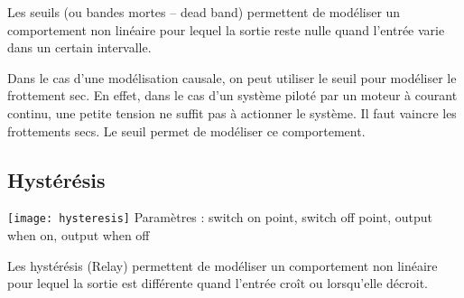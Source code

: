 \begin{marginfigure}[1cm]
\centering
{}
\end{marginfigure}


Les seuils (ou bandes mortes -- dead band) permettent de modéliser un comportement non linéaire pour lequel la sortie reste nulle quand l'entrée varie dans un certain intervalle. 

Dans le cas d'une modélisation causale, on peut utiliser le seuil pour modéliser le frottement sec. En effet, dans le cas d'un système piloté par un moteur à courant continu, une petite tension ne suffit pas à actionner le système. Il faut vaincre les frottements secs. Le seuil permet de modéliser ce comportement.


\subsection{Hystérésis}

\begin{marginfigure}
\centering
\texttt{[image: hysteresis]}
Paramètres : switch on point, switch off point, output when on, output when off
\end{marginfigure}

\begin{marginfigure}
\centering
{}
\end{marginfigure}

Les hystérésis (Relay) permettent de modéliser un comportement non linéaire pour lequel la sortie est différente quand l'entrée croît ou lorsqu'elle décroit. 


